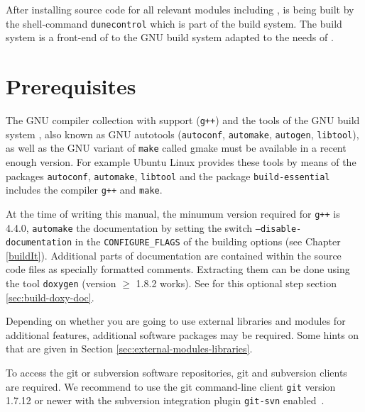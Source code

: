 After installing source code for all relevant \Dune modules including
\eWoms, \Dune is being built by the shell-command \texttt{dunecontrol}
which is part of the \Dune build system. The \Dune build system is a
front-end of to the GNU build system adapted to the needs of \Dune.

\section{Prerequisites} \label{sec:prerequisites}

The GNU compiler collection with \Cplusplus support (\texttt{g++}) and
the tools of the GNU build system \cite{GNU-BS}, also known as GNU
autotools (\texttt{autoconf}, \texttt{automake}, \texttt{autogen},
\texttt{libtool}), as well as the GNU variant of \texttt{make} called
gmake must be available in a recent enough version. For example Ubuntu
Linux provides these tools by means of the packages \texttt{autoconf},
\texttt{automake}, \texttt{libtool} and the  package
\texttt{build-essential} includes the \Cplusplus compiler
\texttt{g++} and \texttt{make}.

At the time of writing this manual, the minumum version required for
\texttt{g++} is 4.4.0, \texttt{automake}  the documentation by setting the switch
\texttt{--disable-documentation} in the \texttt{CONFIGURE\_FLAGS} of
the building options (see Chapter \ref{buildIt}).  Additional parts of
documentation are contained within the source code files as specially
formatted comments.  Extracting them can be done using the tool
\texttt{doxygen} (version $\geqslant$ 1.8.2 works).  See for this
optional step section \ref{sec:build-doxy-doc}.

Depending on whether you are going to use external libraries and
modules for additional \Dune features, additional software packages
may be required. Some hints on that are given in Section
\ref{sec:external-modules-libraries}.

To access the git or subversion software repositories, git and
subversion clients are required. We recommend to use the git
command-line client \texttt{git} version 1.7.12 or newer with the
subversion integration plugin \texttt{git-svn} enabled~\cite{GIT-HP}.

